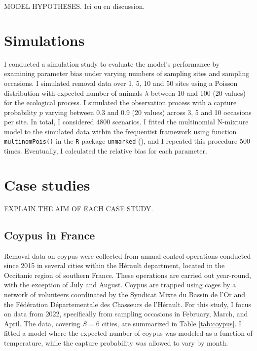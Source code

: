 \documentclass[
  11pt,
  a4paper,
]{article}
\begin{document}
MODEL HYPOTHESES. Ici ou en discussion.

\section{Simulations}\label{simulations}

I conducted a simulation study to evaluate the model's performance by examining parameter bias under varying numbers of sampling sites and sampling occasions. I simulated removal data over 1, 5, 10 and 50 sites using a Poisson distribution with expected number of animals \(\lambda\) between 10 and 100 (20 values) for the ecological process. I simulated the observation process with a capture probability \(p\) varying between 0.3 and 0.9 (20 values) across 3, 5 and 10 occasions per site. In total, I considered 4800 scenarios. I fitted the multinomial N-mixture model to the simulated data within the frequentist framework using function \texttt{multinomPois()} in the \texttt{R} package \texttt{unmarked} (), and I repeated this procedure 500 times. Eventually, I calculated the relative bias for each parameter.

\section{Case studies}\label{case-studies}

EXPLAIN THE AIM OF EACH CASE STUDY.

\subsection{Coypus in France}\label{coypus-in-france}

Removal data on coypus were collected from annual control operations conducted since 2015 in several cities within the Hérault department, located in the Occitanie region of southern France. These operations are carried out year-round, with the exception of July and August. Coypus are trapped using cages by a network of volunteers coordinated by the Syndicat Mixte du Bassin de l'Or and the Fédération Départementale des Chasseurs de l'Hérault. For this study, I focus on data from 2022, specifically from sampling occasions in February, March, and April. The data, covering \(S = 6\) cities, are summarized in Table \ref{tab:coypus}. I fitted a model where the expected number of coypus was modeled as a function of temperature, while the capture probability was allowed to vary by month.
\end{document}
